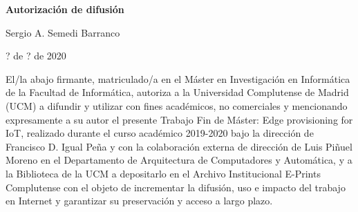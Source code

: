 
\newpage

\thispagestyle{empty}

\begin{center}

{\bf \Huge Autorización de difusión}

\vspace{1cm}


   \large Sergio A. Semedi Barranco\\

   \vspace{0.5cm}


   ? de ? de 2020\\

   \vspace{0.5cm}
   \end{center}
   
El/la abajo firmante, matriculado/a en el Máster en Investigación en Informática de la Facultad de Informática, autoriza a la Universidad Complutense de Madrid (UCM) a difundir y utilizar con fines académicos, no comerciales y mencionando expresamente a su autor el presente Trabajo Fin de Máster: Edge provisioning for IoT, realizado durante el curso académico 2019-2020 bajo la dirección de Francisco D. Igual Peña y con la colaboración externa de dirección de Luis Piñuel Moreno en el Departamento de Arquitectura de Computadores y Automática, y a la Biblioteca de la UCM a depositarlo en el Archivo Institucional E-Prints Complutense con el objeto de incrementar la difusión, uso e impacto del trabajo en Internet y garantizar su preservación y acceso a largo plazo.


